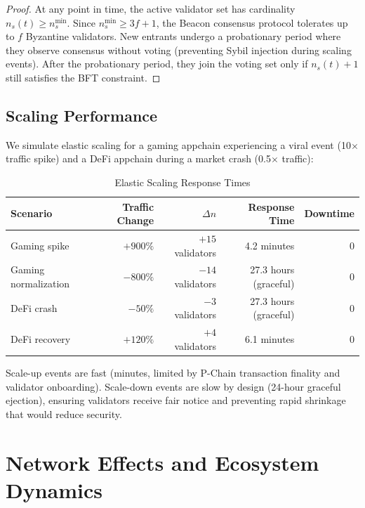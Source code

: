 \documentclass[11pt]{article}
\begin{document}
\begin{proof}
At any point in time, the active validator set has cardinality $n_s(t) \geq n_s^{\min}$.
Since $n_s^{\min} \geq 3f+1$, the Beacon consensus protocol tolerates up to $f$
Byzantine validators. New entrants undergo a probationary period where they observe
consensus without voting (preventing Sybil injection during scaling events). After the
probationary period, they join the voting set only if $n_s(t) + 1$ still satisfies the
BFT constraint.
\end{proof}

\subsection{Scaling Performance}

We simulate elastic scaling for a gaming appchain experiencing a viral event (10$\times$
traffic spike) and a DeFi appchain during a market crash (0.5$\times$ traffic):

\begin{table}[H]
\centering
\caption{Elastic Scaling Response Times}
\label{tab:elastic_perf}
\begin{tabular}{lrrrr}
\toprule
\textbf{Scenario} & \textbf{Traffic Change} & \textbf{$\Delta n$} & \textbf{Response Time} & \textbf{Downtime} \\
\midrule
Gaming spike & $+900\%$ & $+15$ validators & 4.2 minutes & 0 \\
Gaming normalization & $-800\%$ & $-14$ validators & 27.3 hours (graceful) & 0 \\
DeFi crash & $-50\%$ & $-3$ validators & 27.3 hours (graceful) & 0 \\
DeFi recovery & $+120\%$ & $+4$ validators & 6.1 minutes & 0 \\
\bottomrule
\end{tabular}
\end{table}

Scale-up events are fast (minutes, limited by P-Chain transaction finality and validator
onboarding). Scale-down events are slow by design (24-hour graceful ejection), ensuring
validators receive fair notice and preventing rapid shrinkage that would reduce security.

\section{Network Effects and Ecosystem Dynamics}
\end{document}
